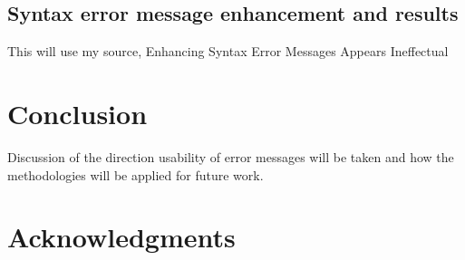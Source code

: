 \documentclass{sig-alternate}
\begin{document}
\subsection{Syntax error message enhancement and results}
This will use my source, Enhancing Syntax Error Messages Appears Ineffectual


\section{Conclusion}
Discussion of the direction usability of error messages will be taken and how the methodologies will be applied for future work.



\section{Acknowledgments}




  

~\cite{Denny:2014:ESE:2591708.2591748}
~\cite{Hartmann:2010:OPS:1753326.1753478}
~\cite{Isa:1983:MOE:800045.801583}
~\cite{Marceau:2011:MEE:1953163.1953308}
~\cite{Marceau:2011:MYL:2048237.2048241}
~\cite{Murphy:2008:BTD:1352135.1352193}
~\cite{Traver:2010}
~\cite{Kummerfeld:2003:NBF:858403.858416}
\end{document}
